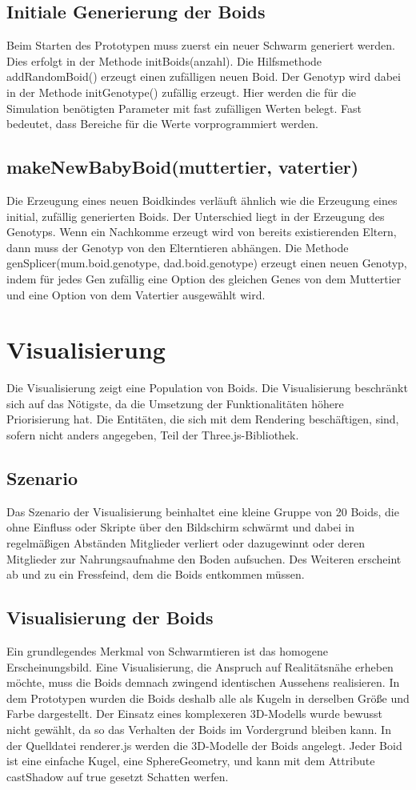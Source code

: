 \documentclass[draft=false
              ,paper=a4
              ,twoside=false
              ,fontsize=11pt
              ,headsepline
              ,BCOR10mm
              ,DIV11
              ,bibtotoc
              ,liststotoc
              ]{scrbook}
\begin{document}
\subsection{Initiale Generierung der Boids}
Beim Starten des Prototypen muss zuerst ein neuer Schwarm generiert werden. Dies erfolgt in der Methode initBoids(anzahl). Die Hilfsmethode addRandomBoid() erzeugt einen zufälligen neuen Boid. Der Genotyp wird dabei in der Methode initGenotype() zufällig erzeugt. Hier werden die für die Simulation benötigten Parameter mit fast zufälligen Werten belegt. Fast bedeutet, dass Bereiche für die Werte vorprogrammiert werden.

\subsection{makeNewBabyBoid(muttertier, vatertier)}\label{babies}
Die Erzeugung eines neuen Boidkindes verläuft ähnlich wie die Erzeugung eines initial, zufällig generierten Boids. Der Unterschied liegt in der Erzeugung des Genotyps. Wenn ein Nachkomme erzeugt wird von bereits existierenden Eltern, dann muss der Genotyp von den Elterntieren abhängen. Die Methode genSplicer(mum.boid.genotype, dad.boid.genotype) erzeugt einen neuen Genotyp, indem für jedes Gen zufällig eine Option des gleichen Genes von dem Muttertier und eine Option von dem Vatertier ausgewählt wird.

\section{Visualisierung}\label{visual}
Die Visualisierung zeigt eine Population von Boids. Die Visualisierung beschränkt sich auf das Nötigste, da die Umsetzung der Funktionalitäten höhere Priorisierung hat.
Die Entitäten, die sich mit dem Rendering beschäftigen, sind, sofern nicht anders angegeben, Teil der Three.js-Bibliothek.

\subsection{Szenario}
Das Szenario der Visualisierung beinhaltet eine kleine Gruppe von 20 Boids, die ohne Einfluss oder Skripte über den Bildschirm schwärmt und dabei in regelmäßigen Abständen Mitglieder verliert oder dazugewinnt oder deren Mitglieder zur Nahrungsaufnahme den Boden aufsuchen. Des Weiteren erscheint ab und zu ein Fressfeind, dem die Boids entkommen müssen.
\subsection{Visualisierung der Boids}
Ein grundlegendes Merkmal von Schwarmtieren ist das homogene Erscheinungsbild. Eine Visualisierung, die Anspruch auf Realitätsnähe erheben möchte, muss die Boids demnach zwingend identischen Aussehens realisieren. In dem Prototypen wurden die Boids deshalb alle als Kugeln in derselben Größe und Farbe dargestellt. Der Einsatz eines komplexeren 3D-Modells wurde bewusst nicht gewählt, da so das Verhalten der Boids im Vordergrund bleiben kann. In der Quelldatei renderer.js werden die 3D-Modelle der Boids angelegt. Jeder Boid ist eine einfache Kugel, eine SphereGeometry, und kann mit dem Attribute castShadow auf true gesetzt Schatten werfen.
\end{document}
